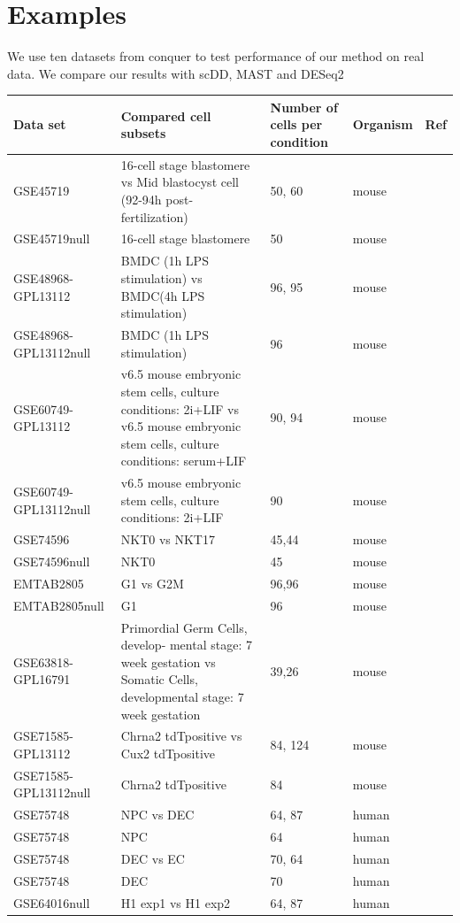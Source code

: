 \documentclass[11pt]{amsart}
\begin{document}
\section{Examples}
We use ten datasets from conquer\cite{ref:Cq} to test performance of our method on real data. We compare our results with scDD\cite{ref:scDD}, MAST\cite{ref:MAST} and DESeq2\cite{ref:Des}\\
\begin{center}
\begin{tabular}{ |p{3cm}|p{6cm}|p{2cm}|p{2cm}|p{1cm}|}
\hline
 Data set & Compared cell subsets & Number of cells per condition & Organism & Ref\\
 \hline
 \hline
 GSE45719 & 16-cell stage blastomere vs Mid blastocyst cell (92-94h post- fertilization) & 50, 60 & mouse & \cite{Deng193}\\
 \hline
 GSE45719null &  16-cell stage blastomere & 50 & mouse &  \cite{Deng193}\\
 \hline
 GSE48968-GPL13112 & BMDC (1h LPS stimulation) vs BMDC(4h LPS stimulation) & 96, 95 & mouse & \cite{Shalek}\\
 \hline
 GSE48968-GPL13112null & BMDC (1h LPS stimulation) & 96 & mouse & \cite{Shalek}\\
 \hline
 GSE60749-GPL13112 & v6.5 mouse embryonic stem cells, culture conditions: 2i+LIF vs v6.5 mouse embryonic stem cells, culture conditions: serum+LIF & 90, 94 & mouse & \cite{Kumar}\\
 \hline
 GSE60749-GPL13112null & v6.5 mouse embryonic stem cells, culture conditions: 2i+LIF & 90 & mouse & \cite{Kumar}\\
 \hline
 GSE74596 & NKT0 vs NKT17 & 45,44 & mouse & \cite{Engel}\\
 \hline
 GSE74596null & NKT0 & 45 & mouse & \cite{Engel}\\
 \hline
 
 EMTAB2805 & G1 vs G2M & 96,96 & mouse & \cite{EMTAB}\\
 \hline
 EMTAB2805null & G1 & 96 & mouse & \cite{EMTAB}\\
 \hline
 GSE63818-GPL16791 & Primordial Germ Cells, develop- mental stage: 7 week gestation vs Somatic Cells, developmental stage: 7 week gestation & 39,26 & mouse & \cite{Guo}\\
 \hline
 GSE71585-GPL13112 & Chrna2 tdTpositive vs Cux2 tdTpositive & 84, 124 & mouse & \cite{Tasic}\\
 \hline
GSE71585-GPL13112null & Chrna2 tdTpositive & 84 & mouse & \cite{Tasic}\\
\hline
GSE75748 & NPC vs DEC & 64, 87 & human & \cite{chu}\\
\hline
GSE75748 & NPC & 64 & human & \cite{chu}\\
\hline
GSE75748 & DEC vs EC & 70, 64 & human & \cite{chu}\\
\hline
GSE75748 & DEC & 70 & human & \cite{chu}\\
\hline
GSE64016null & H1 exp1 vs H1 exp2 & 64, 87 & human & \cite{oscope}\\
\hline
\end{tabular}
\end{center}
\end{document}
